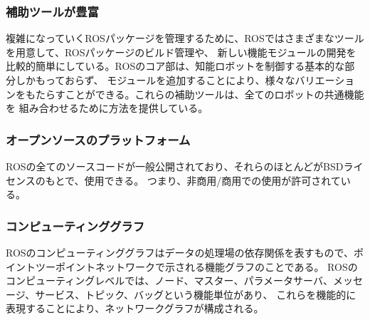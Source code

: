 \subsubsection{補助ツールが豊富}
複雑になっていくROSパッケージを管理するために、ROSではさまざまなツールを用意して、ROSパッケージのビルド管理や、
新しい機能モジュールの開発を比較的簡単にしている。ROSのコア部は、知能ロボットを制御する基本的な部分しかもっておらず、
モジュールを追加することにより、様々なバリエーションをもたらすことができる。これらの補助ツールは、全てのロボットの共通機能を
組み合わせるために方法を提供している。

\subsubsection{オープンソースのプラットフォーム}
ROSの全てのソースコードが一般公開されており、それらのほとんどがBSDライセンスのもとで、使用できる。
つまり、非商用/商用での使用が許可されている。

\subsubsection{コンピューティンググラフ}
ROSのコンピューティンググラフはデータの処理場の依存関係を表すもので、ポイントツーポイントネットワークで示される機能グラフのことである。
ROSのコンピューティングレベルでは、ノード、マスター、パラメータサーバ、メッセージ、サービス、トピック、バッグという機能単位があり、
これらを機能的に表現することにより、ネットワークグラフが構成される。

